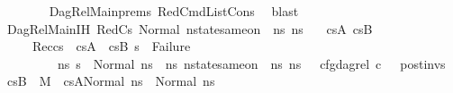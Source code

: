 \begin{isabellebody}
\ \ \ \ \ \ \isamarkupfalse%
\ DagRel{\isacharunderscore}{\kern0pt}Main{\isachardot}{\kern0pt}prems{\isacharparenleft}{\kern0pt}{}{\isacharparenright}{\kern0pt}\ RedCmdListCons\ \isamarkupfalse%
\ blast\isanewline
\ \ \ \ \isamarkupfalse%
\ DagRel{\isacharunderscore}{\kern0pt}Main{\isachardot}{\kern0pt}IH\ RedCs{}\ Normal\ {\isacartoucheopen}nstate{\isacharunderscore}{\kern0pt}same{\isacharunderscore}{\kern0pt}on\ {\isasymLambda}\ ns{}{\isacharprime}{\kern0pt}{\isacharprime}{\kern0pt}\ ns{}{\isacharprime}{\kern0pt}{\isacharprime}{\kern0pt}\ {\isacharbraceleft}{\kern0pt}{\isacharbraceright}{\kern0pt}{\isacartoucheclose}\ \isamarkupfalse%
\ cs{}A\ cs{}B\ \ \isanewline
\ \ \ \ \ Rec{\isacharcolon}{\kern0pt}{\isachardoublequoteopen}cs{}\ {\isacharequal}{\kern0pt}\ cs{}A\ {\isacharat}{\kern0pt}\ cs{}B{\isachardoublequoteclose}\ {\isachardoublequoteopen}s{\isacharprime}{\kern0pt}\ {\isasymnoteq}\ Failure{\isachardoublequoteclose}\ \isanewline
\ \ \ \ \ \ \ \ \ {\isachardoublequoteopen}{\isasymforall}ns{}{\isacharprime}{\kern0pt}{\isachardot}{\kern0pt}\ s{\isacharprime}{\kern0pt}\ {\isacharequal}{\kern0pt}\ Normal\ ns{}{\isacharprime}{\kern0pt}\ {\isasymlongrightarrow}\ {\isacharparenleft}{\kern0pt}{\isasymexists}ns{}{\isacharprime}{\kern0pt}{\isachardot}{\kern0pt}\ nstate{\isacharunderscore}{\kern0pt}same{\isacharunderscore}{\kern0pt}on\ {\isasymLambda}\ ns{}{\isacharprime}{\kern0pt}\ ns{}{\isacharprime}{\kern0pt}\ {\isacharbraceleft}{\kern0pt}{\isacharbraceright}{\kern0pt}\ {\isasymand}\ cfg{\isacharunderscore}{\kern0pt}dag{\isacharunderscore}{\kern0pt}rel\ c\ {\isacharbrackleft}{\kern0pt}{\isacharbrackright}{\kern0pt}\ {\isacharbrackleft}{\kern0pt}{\isacharbrackright}{\kern0pt}\ post{\isacharunderscore}{\kern0pt}invs\ {\isacharbrackleft}{\kern0pt}{\isacharbrackright}{\kern0pt}\ cs{}B\ {\isasymand}\ M{\isacharcomma}{\kern0pt}{\isasymLambda}{\isacharcomma}{\kern0pt}{\isasymGamma}{\isacharcomma}{\kern0pt}{\isasymOmega}\ {\isasymturnstile}\ {\isasymlangle}cs{}A{\isacharcomma}{\kern0pt}Normal\ ns{}{\isacharprime}{\kern0pt}{\isacharprime}{\kern0pt}{\isasymrangle}\ {\isacharbrackleft}{\kern0pt}{\isasymrightarrow}{\isacharbrackright}{\kern0pt}\ Normal\ ns{}{\isacharprime}{\kern0pt}{\isacharparenright}{\kern0pt}{\isachardoublequoteclose}\isanewline
\ \ \ \ \ \ \isamarkupfalse%

\end{isabellebody}
